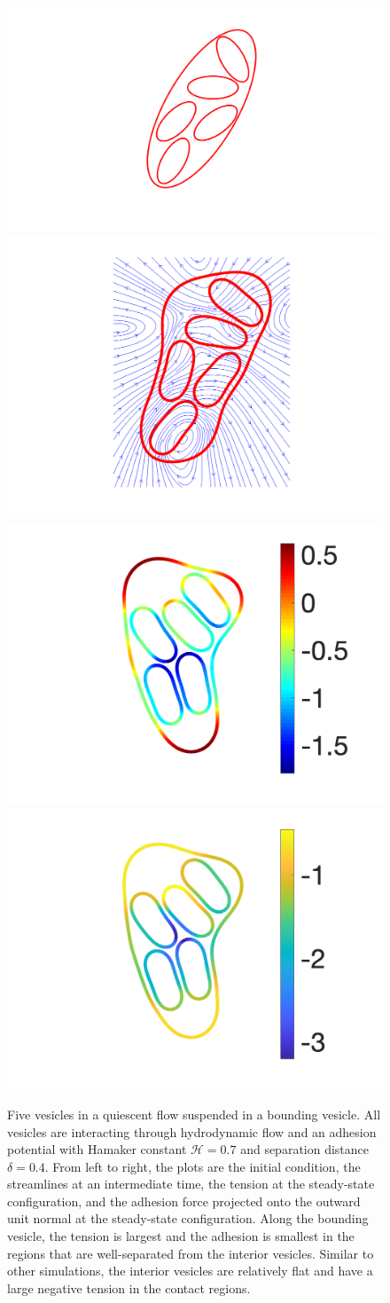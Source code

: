 \documentclass[prf,superscriptaddress,showkeys]{revtex4-1}
\begin{document}
\begin{figure}[htp]
\centering
\includegraphics[height=0.24\textwidth,trim={10cm 0cm 10cm 0cm},clip]{figs/relaxationManyVesInitialCondition.png}
\includegraphics[height=0.24\textwidth,trim={2cm 0cm 2cm 0cm},clip]{figs/relaxationManyVesStreamlines.png}
\includegraphics[height=0.24\textwidth,trim={2cm 0cm 1cm 0cm},clip]{figs/relaxationManyVesTension.png}
\includegraphics[height=0.24\textwidth,trim={2cm 0cm 2cm 0cm},clip]{figs/relaxationManyVesAdhesion.png}
\caption{\label{fig:relaxationManyVes} Five vesicles in a quiescent flow
suspended in a bounding vesicle.   All vesicles are interacting through
hydrodynamic flow and an adhesion potential with Hamaker constant
$\mathcal{H} = 0.7$ and separation distance $\delta = 0.4$.  From left
to right, the plots are the initial condition, the streamlines at an
intermediate time, the tension at the steady-state configuration, and
the adhesion force projected onto the outward unit normal at the
steady-state configuration.  Along the bounding vesicle, the tension is
largest and the adhesion is smallest in the regions that are
well-separated from the interior vesicles.  Similar to other
simulations, the interior vesicles are relatively flat and have a large
negative tension in the contact regions.}
\end{figure}
\end{document}
